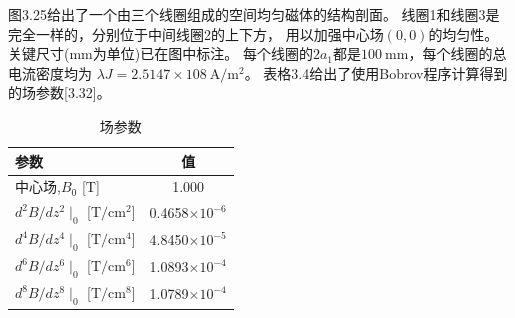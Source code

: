 图3.25给出了一个由三个线圈组成的空间均匀磁体的结构剖面。
线圈1和线圈3是完全一样的，分别位于中间线圈2的上下方，
用以加强中心场$(0,0)$的均匀性。
关键尺寸(mm为单位)已在图中标注。
每个线圈的$2a_1$都是$100\ \mathrm{mm}$，每个线圈的总电流密度均为
$\lambda J =2.5147×108\ \mathrm{A/m^2} $。
表格3.4给出了使用Bobrov程序计算得到的场参数[3.32]。

\begin{table}[htbp]\small
\centering
\caption{场参数}
\begin{tabular}{|l|c|}
	\hline
		参数                 & 值                    \\ \hline
	中心场,$B_0$  [T] & 1.000                    \\ 
	$d^2B/dz^2\mid_0$     [$\mathrm{T/cm^2}$]      & 0.4658$\times10^{-6} $\\ 
	$d^4B/dz^4\mid_0  $  [$\mathrm{T/cm^4}$] & 4.8450$\times10^{-5} $\\ 
	$d^6B/dz^6\mid_0 $   [$\mathrm{T/cm^6}$]   & 1.0893$\times10^{-4} $\\
	$d^8B/dz^8\mid_0$ [$\mathrm{T/cm^8}$]    & 1.0789$\times10^{-4}$ \\ \hline
	\end{tabular}
\end{table}

